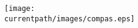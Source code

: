 \vfill

\vfill
\begin{center}
    \texttt{[image: \\currentpath/images/compas.eps]}
\end{center}
\vfill
% 
